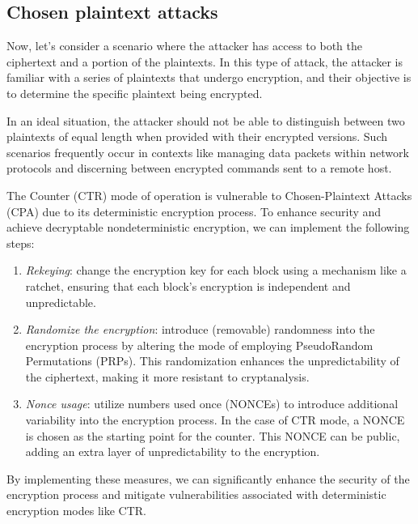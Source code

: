 \subsection{Chosen plaintext attacks}
Now, let's consider a scenario where the attacker has access to both the ciphertext and a portion of the plaintexts.
In this type of attack, the attacker is familiar with a series of plaintexts that undergo encryption, and their objective is to determine the specific plaintext being encrypted.

In an ideal situation, the attacker should not be able to distinguish between two plaintexts of equal length when provided with their encrypted versions.
Such scenarios frequently occur in contexts like managing data packets within network protocols and discerning between encrypted commands sent to a remote host.

The Counter (CTR) mode of operation is vulnerable to Chosen-Plaintext Attacks (CPA) due to its deterministic encryption process.
To enhance security and achieve decryptable nondeterministic encryption, we can implement the following steps:
\begin{enumerate}
    \item \textit{Rekeying}: change the encryption key for each block using a mechanism like a ratchet, ensuring that each block's encryption is independent and unpredictable.
    \item \textit{Randomize the encryption}: introduce (removable) randomness into the encryption process by altering the mode of employing PseudoRandom Permutations (PRPs). 
        This randomization enhances the unpredictability of the ciphertext, making it more resistant to cryptanalysis.
    \item \textit{Nonce usage}: utilize numbers used once (NONCEs) to introduce additional variability into the encryption process. 
        In the case of CTR mode, a NONCE is chosen as the starting point for the counter. 
        This NONCE can be public, adding an extra layer of unpredictability to the encryption.
\end{enumerate}
By implementing these measures, we can significantly enhance the security of the encryption process and mitigate vulnerabilities associated with deterministic encryption modes like CTR.

